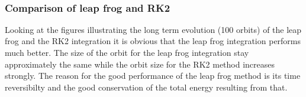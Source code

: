 \documentclass[11pt]{article}
\begin{document}
    \begin{center}
    \end{center}
    { \hspace*{\fill} \\}
    
    \hypertarget{comparison-of-leap-frog-and-rk2}{%
\subsubsection{Comparison of leap frog and
RK2}\label{comparison-of-leap-frog-and-rk2}}

Looking at the figures illustrating the long term evolution (100 orbits)
of the leap frog and the RK2 integration it is obvious that the leap
frog integration performs much better. The size of the orbit for the
leap frog integration stay approximately the same while the orbit size
for the RK2 method increases strongly. The reason for the good
performance of the leap frog method is its time reversibilty and the
good conservation of the total energy resulting from that.


    
    
    
\end{document}
